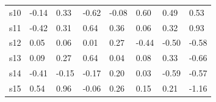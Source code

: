 \begin{table}[]
\begin{tabular}{llllllll}
s10 & -0.14                                                         & \cellcolor[HTML]{C0C0C0}0.33                                 & -0.62                                                                   & -0.08                        & \cellcolor[HTML]{C0C0C0}0.60                                     & \cellcolor[HTML]{C0C0C0}0.49                                         & \cellcolor[HTML]{C0C0C0}0.53                                               \\
s11 & -0.42                                                         & \cellcolor[HTML]{C0C0C0}0.31                                 & \cellcolor[HTML]{9B9B9B}0.64                                            & \cellcolor[HTML]{C0C0C0}0.36 & \cellcolor[HTML]{EFEFEF}0.06                                     & \cellcolor[HTML]{C0C0C0}0.32                                         & \cellcolor[HTML]{9B9B9B}0.93                                               \\
s12 & \cellcolor[HTML]{EFEFEF}0.05                                  & \cellcolor[HTML]{EFEFEF}0.06                                 & \cellcolor[HTML]{EFEFEF}0.01                                            & \cellcolor[HTML]{C0C0C0}0.27 & -0.44                                                            & -0.50                                                                & -0.58                                                                      \\
s13 & \cellcolor[HTML]{EFEFEF}0.09                                  & \cellcolor[HTML]{C0C0C0}0.27                                 & \cellcolor[HTML]{9B9B9B}0.64                                            & \cellcolor[HTML]{EFEFEF}0.04 & \cellcolor[HTML]{EFEFEF}0.08                                     & \cellcolor[HTML]{C0C0C0}0.33                                         & -0.66                                                                      \\
s14 & -0.41                                                         & -0.15                                                        & -0.17                                                                   & \cellcolor[HTML]{C0C0C0}0.20 & \cellcolor[HTML]{EFEFEF}0.03                                     & -0.59                                                                & -0.57                                                                      \\
s15 & \cellcolor[HTML]{C0C0C0}0.54                                  & \cellcolor[HTML]{9B9B9B}0.96                                 & -0.06                                                                   & \cellcolor[HTML]{C0C0C0}0.26 & \cellcolor[HTML]{C0C0C0}0.15                                     & \cellcolor[HTML]{C0C0C0}0.21                                         & -1.16                                                                      \\

\end{tabular}
\end{table}
